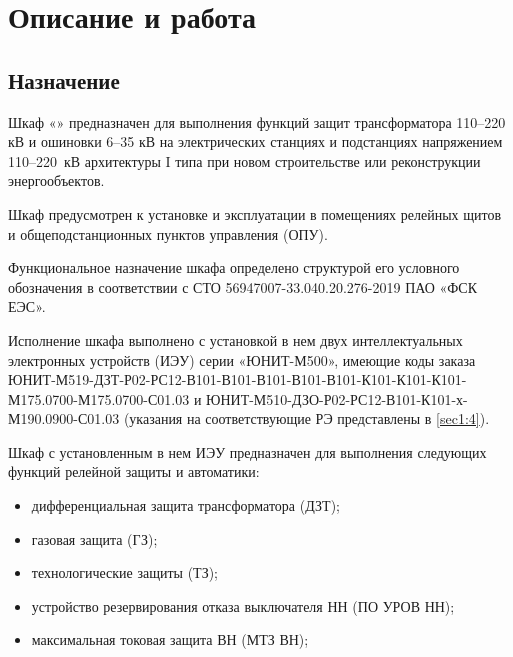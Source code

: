 {\color{unidarkgreen}\section[Описание и работа]{Описание и работа}}

{\color{unidarkgreen}\subsection{Назначение}}

\begin{enumsub}
\item Шкаф «\devicetype» предназначен для выполнения функций защит трансформатора 110–220 кВ и ошиновки 6–35 кВ на электрических станциях и подстанциях напряжением 110–220~кВ архитектуры I типа при новом строительстве или реконструкции энергообъектов.
\item Шкаф предусмотрен к установке и эксплуатации в помещениях релейных щитов и общеподстанционных пунктов управления (ОПУ).
\item Функциональное назначение шкафа определено структурой его условного обозначения в соответствии с СТО 56947007-33.040.20.276-2019 ПАО «ФСК ЕЭС».
\item Исполнение шкафа выполнено с установкой в нем двух интеллектуальных электронных устройств (ИЭУ) серии «ЮНИТ-М500», имеющие коды заказа ЮНИТ-М519-ДЗТ-Р02-РС12-В101-В101-В101-В101-В101-К101-К101-К101-М175.0700-М175.0700-С01.03 и ЮНИТ-М510-ДЗО-Р02-РС12-В101-К101-х-М190.0900-С01.03 (указания на соответствующие РЭ представлены в \ref{sec1:4}). 
\item Шкаф с установленным в нем ИЭУ предназначен для выполнения следующих функций релейной защиты и автоматики:
  \begin{itemize}
  \item дифференциальная защита трансформатора (ДЗТ);
  \item газовая защита (ГЗ);
  \item технологические защиты (ТЗ);
  \item устройство резервирования отказа выключателя НН (ПО УРОВ НН);
  \item максимальная токовая защита ВН (МТЗ ВН);

\end{itemize}
\end{enumsub}
